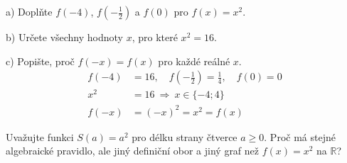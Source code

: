 \documentclass[11pt,a4paper]{article}
\begin{document}
\begin{zadaniReseniBox}[title={Samostatná práce 1}]
a) Doplňte $f(-4)$, $f(-\tfrac12)$ a $f(0)$ pro $f(x)=x^2$.\par
b) Určete všechny hodnoty $x$, pro které $x^2=16$.\par
c) Popište, proč $f(-x)=f(x)$ pro každé reálné $x$.
\tcblower
\[
\begin{aligned}
f(-4)&=16,\quad f(-\tfrac12)=\tfrac14,\quad f(0)=0 \\
x^2&=16\ \Longrightarrow\ x\in\{-4;4\} \\
f(-x)&=(-x)^2=x^2=f(x)
\end{aligned}
\]

\end{zadaniReseniBox}
Uvažujte funkci $S(a)=a^2$ pro délku strany čtverce $a\ge0$. Proč má stejné algebraické pravidlo, ale jiný definiční obor a jiný graf než $f(x)=x^2$ na $\mathbb R$?
\end{document}
